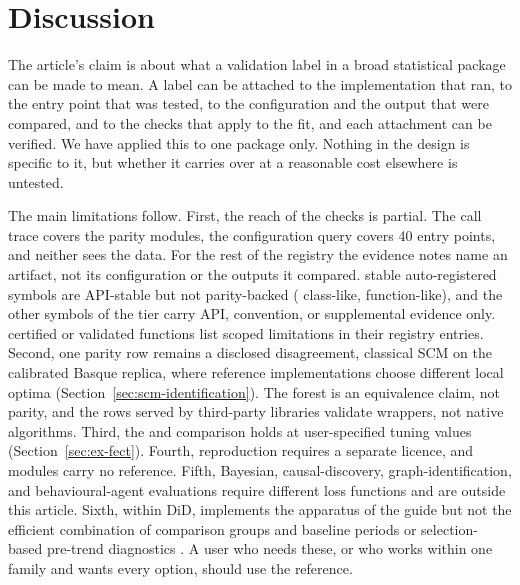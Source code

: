 \section{Discussion}\label{sec:discussion}

The article's claim is about what a validation label in a broad statistical
package can be made to mean. A label can be attached to the implementation that
ran, to the entry point that was tested, to the configuration and the output
that were compared, and to the checks that apply to the fit, and each attachment
can be verified. We have applied this to one package only. Nothing in the design
is specific to it, but whether it carries over at a reasonable cost elsewhere is
untested.

The main limitations follow. First, the reach of the checks is partial. The
call trace covers the parity modules, the configuration query covers 40 entry points, and neither sees the data. For the rest of the registry the evidence
notes name an artifact, not its configuration or the outputs it compared.
\RegistryAutoUnbacked{} stable auto-registered symbols are API-stable but not
parity-backed (\RegistryAutoUnbackedClasslike{} class-like,
\RegistryAutoUnbackedFunctionlike{} function-like), and the other
\RegistryOtherApiEvidence{} symbols of the  tier carry API,
convention, or supplemental evidence only. \ScopedLimitationCount{} certified or
validated functions list scoped limitations in their registry entries. Second,
one parity row remains a disclosed disagreement, classical SCM on the calibrated
Basque replica, where reference implementations choose different local optima
(Section~\ref{sec:scm-identification}). The forest is an equivalence claim, not
parity, and the \ParityThirdPartyModuleCount{} rows served by third-party
 libraries validate wrappers, not native algorithms. Third, the
 and  comparison holds at user-specified tuning values
(Section~\ref{sec:ex-fect}). Fourth,  reproduction requires a
separate licence, and \NoStataModuleCount{} modules carry no 
reference. Fifth, Bayesian, causal-discovery, graph-identification, and
behavioural-agent evaluations require different loss functions and are outside
this article. Sixth,
within DiD, \statspai{} implements the apparatus of the
\citet{baker2026difference} guide but not the efficient combination of comparison
groups and baseline periods \citep{chen2025efficient} or selection-based
pre-trend diagnostics \citep{ghanem2026selection}. A user who needs these, or who
works within one family and wants every option, should use the reference.


